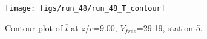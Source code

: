 \begin{figure}[H]
\centering
\texttt{[image: figs/run\_48/run\_48\_T\_contour]}
\caption{Contour plot of $\overline{t}$ at $z/c$=9.00, $V_{free}$=29.19, station 5.}
\end{figure}


